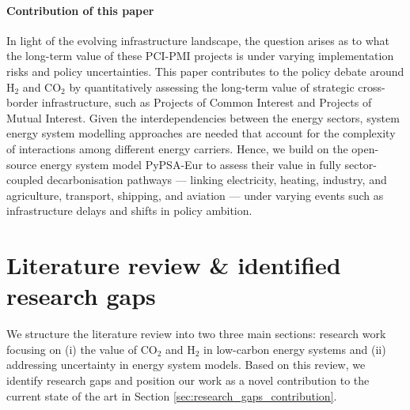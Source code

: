 \documentclass[pdflatex,sn-nature]{sn-jnl}%
\theoremstyle{thmstyleone}%
\theoremstyle{thmstyletwo}%
\theoremstyle{thmstylethree}%
\begin{document}
\paragraph{Contribution of this paper}
In light of the evolving infrastructure landscape, the question arises as to what the long-term value of these PCI-PMI projects is under varying implementation risks and policy uncertainties.
This paper contributes to the policy debate around H$_2$ and CO$_2$ by quantitatively assessing the long-term value of strategic cross-border infrastructure, such as Projects of Common Interest and Projects of Mutual Interest. Given the interdependencies between the energy sectors, system energy system modelling approaches are needed that account for the complexity of interactions among different energy carriers. Hence, we build on the open-source energy system model PyPSA-Eur to assess their value in fully sector-coupled decarbonisation pathways --- linking electricity, heating, industry, and agriculture, transport, shipping, and aviation --- under varying events such as infrastructure delays and shifts in policy ambition. 

\section{Literature review \& identified research gaps}\label{sec:literature_review}
We structure the literature review into two three main sections: research work focusing on (i) the value of CO$_2$ and H$_2$ in low-carbon energy systems and (ii) addressing uncertainty in energy system models. Based on this review, we identify research gaps and position our work as a novel contribution to the current state of the art in Section \ref{sec:research_gaps_contribution}.
 
\end{document}
